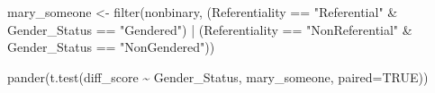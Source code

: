 \documentclass[
]{article}
\newenvironment{Shaded}{\begin{snugshade}}{\end{snugshade}}
\newcommand{\AttributeTok}[1]{\textcolor[rgb]{0.77,0.63,0.00}{#1}}
\newcommand{\ConstantTok}[1]{\textcolor[rgb]{0.00,0.00,0.00}{#1}}
\newcommand{\FunctionTok}[1]{\textcolor[rgb]{0.00,0.00,0.00}{#1}}
\newcommand{\NormalTok}[1]{#1}
\newcommand{\OtherTok}[1]{\textcolor[rgb]{0.56,0.35,0.01}{#1}}
\newcommand{\SpecialCharTok}[1]{\textcolor[rgb]{0.00,0.00,0.00}{#1}}
\newcommand{\StringTok}[1]{\textcolor[rgb]{0.31,0.60,0.02}{#1}}
\begin{document}
\begin{Shaded}
\begin{Highlighting}[]
\NormalTok{mary\_someone }\OtherTok{\textless{}{-}} \FunctionTok{filter}\NormalTok{(nonbinary, (Referentiality }\SpecialCharTok{==} \StringTok{"Referential"} \SpecialCharTok{\&}\NormalTok{ Gender\_Status }\SpecialCharTok{==} \StringTok{"Gendered"}\NormalTok{) }\SpecialCharTok{|}\NormalTok{ (Referentiality }\SpecialCharTok{==} \StringTok{"NonReferential"} \SpecialCharTok{\&}\NormalTok{ Gender\_Status }\SpecialCharTok{==} \StringTok{"NonGendered"}\NormalTok{))}

\FunctionTok{pander}\NormalTok{(}\FunctionTok{t.test}\NormalTok{(diff\_score }\SpecialCharTok{\textasciitilde{}}\NormalTok{ Gender\_Status, mary\_someone, }\AttributeTok{paired=}\ConstantTok{TRUE}\NormalTok{))}
\end{Highlighting}
\end{Shaded}
\end{document}
